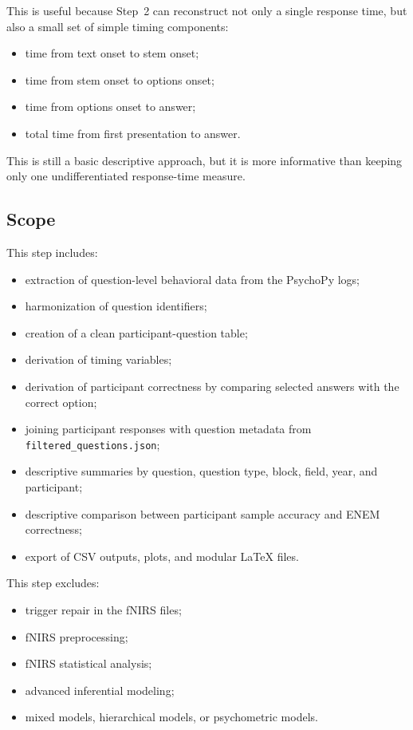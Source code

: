 \documentclass[11pt]{article}
\begin{document}
This is useful because Step~2 can reconstruct not only a single response time, but also a small set of simple timing components:
\begin{itemize}
    \item time from text onset to stem onset;
    \item time from stem onset to options onset;
    \item time from options onset to answer;
    \item total time from first presentation to answer.
\end{itemize}

This is still a basic descriptive approach, but it is more informative than keeping only one undifferentiated response-time measure.

\subsection{Scope}
This step includes:
\begin{itemize}
    \item extraction of question-level behavioral data from the PsychoPy logs;
    \item harmonization of question identifiers;
    \item creation of a clean participant-question table;
    \item derivation of timing variables;
    \item derivation of participant correctness by comparing selected answers with the correct option;
    \item joining participant responses with question metadata from \texttt{filtered\_questions.json};
    \item descriptive summaries by question, question type, block, field, year, and participant;
    \item descriptive comparison between participant sample accuracy and ENEM correctness;
    \item export of CSV outputs, plots, and modular \LaTeX{} files.
\end{itemize}

This step excludes:
\begin{itemize}
    \item trigger repair in the fNIRS files;
    \item fNIRS preprocessing;
    \item fNIRS statistical analysis;
    \item advanced inferential modeling;
    \item mixed models, hierarchical models, or psychometric models.
\end{itemize}
\end{document}
